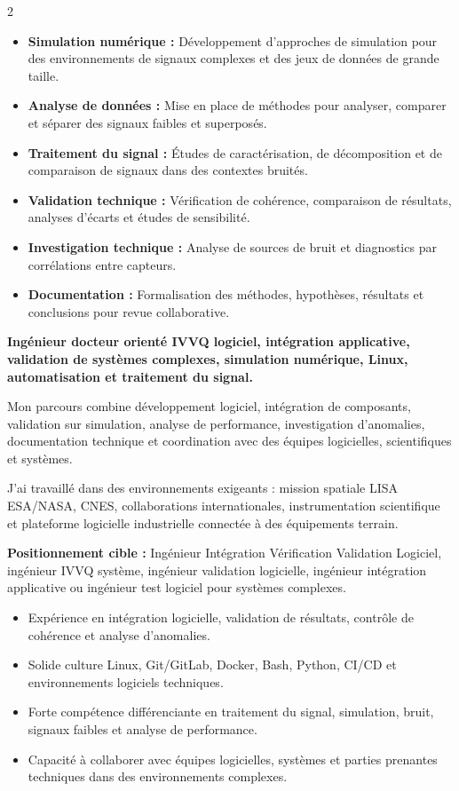 \documentclass[8pt,a4paper,ragged2e,withhyper]{../_shared/altacv}
\begin{document}
\begin{paracol}{2}
\begin{itemize}
  \item \textbf{Simulation numérique :} Développement d’approches de simulation pour des environnements de signaux complexes et des jeux de données de grande taille.
  \item \textbf{Analyse de données :} Mise en place de méthodes pour analyser, comparer et séparer des signaux faibles et superposés.
  \item \textbf{Traitement du signal :} Études de caractérisation, de décomposition et de comparaison de signaux dans des contextes bruités.
  \item \textbf{Validation technique :} Vérification de cohérence, comparaison de résultats, analyses d’écarts et études de sensibilité.
  \item \textbf{Investigation technique :} Analyse de sources de bruit et diagnostics par corrélations entre capteurs.
  \item \textbf{Documentation :} Formalisation des méthodes, hypothèses, résultats et conclusions pour revue collaborative.
\end{itemize}

\switchcolumn


\textbf{Ingénieur docteur orienté IVVQ logiciel, intégration applicative, validation de systèmes complexes, simulation numérique, Linux, automatisation et traitement du signal.}

Mon parcours combine développement logiciel, intégration de composants, validation sur simulation, analyse de performance, investigation d’anomalies, documentation technique et coordination avec des équipes logicielles, scientifiques et systèmes.

J’ai travaillé dans des environnements exigeants : mission spatiale LISA ESA/NASA, CNES, collaborations internationales, instrumentation scientifique et plateforme logicielle industrielle connectée à des équipements terrain.

\medskip

\textbf{Positionnement cible :} Ingénieur Intégration Vérification Validation Logiciel, ingénieur IVVQ système, ingénieur validation logicielle, ingénieur intégration applicative ou ingénieur test logiciel pour systèmes complexes.

\begin{itemize}
  \item Expérience en intégration logicielle, validation de résultats, contrôle de cohérence et analyse d’anomalies.
  \item Solide culture Linux, Git/GitLab, Docker, Bash, Python, CI/CD et environnements logiciels techniques.
  \item Forte compétence différenciante en traitement du signal, simulation, bruit, signaux faibles et analyse de performance.
  \item Capacité à collaborer avec équipes logicielles, systèmes et parties prenantes techniques dans des environnements complexes.
\end{itemize}


\end{paracol}
\end{document}
